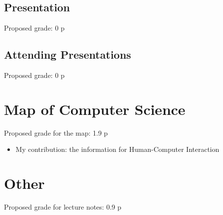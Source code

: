 \documentclass[]{article}
\begin{document}
\subsection{Presentation}
Proposed grade: 0 p

\subsection{Attending Presentations}
Proposed grade: 0 p

\section{Map of Computer Science}
Proposed grade for the map: 1.9 p

\begin{itemize}
	\item My contribution: the information for Human-Computer Interaction
\end{itemize}

\section{Other}
Proposed grade for lecture notes: 0.9 p
\end{document}
